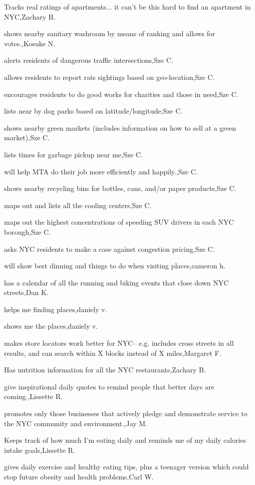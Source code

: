\documentclass{article}
\begin{document}
Tracks real ratings of apartments... it can't be this hard to find an apartment in NYC,Zachary B.

shows nearby sanitary washroom by means of ranking and allows for votes.,Kosuke N.

alerts residents of dangerous traffic intersections,Sze C.

allows residents to report rats sightings based on geo-location,Sze C.

encourages residents to do good works for charities and those in need,Sze C.

lists near by dog parks based on latitude/longitude,Sze C.

shows nearby green markets (includes information on how to sell at a green market),Sze C.

lists times for garbage pickup near me,Sze C.

will help MTA do their job more efficiently and happily.,Sze C.

shows nearby recycling bins for bottles, cans, and/or paper products,Sze C.

maps out and lists all the cooling centers,Sze C.

maps out the highest concentrations of speeding SUV drivers in each NYC borough,Sze C.

asks NYC residents to make a case against congestion pricing,Sze C.

will show best dinning and things to do when visiting places,cameron h.

has a calendar of all the running and biking events that close down NYC streets,Dan K.

helps me finding places,daniely v.

shows me the places,daniely v.

makes store locators work better for NYC-- e.g. includes cross streets in all results, and can search within X blocks instead of X miles,Margaret F.

Has nutrition information for all the NYC restaurants,Zachary B.

give inspirational daily quotes to remind people that better days are coming.,Lissette R.

promotes only those businesses that actively pledge and demonstrate service to the NYC community and environment.,Jay M.

Keeps track of how much I'm eating daily and reminds me of my daily calories intake goals,Lissette R.

gives daily exercise and healthy eating tips, plus a teenager version which could stop future obesity and health problems,Carl W.
\end{document}
